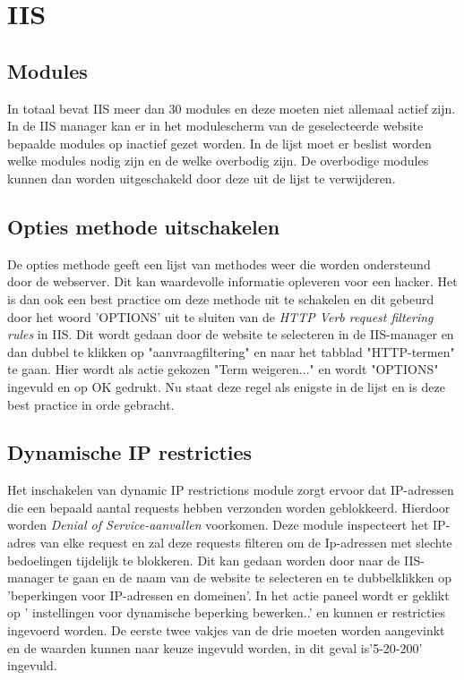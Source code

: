 \documentclass[pdftex,a4paper,12pt]{report}
\begin{document}
\section{IIS}
\subsection{Modules}
In totaal bevat IIS meer dan 30 modules en deze moeten niet allemaal actief zijn. In de IIS manager kan er in het modulescherm van de geselecteerde website bepaalde modules op inactief gezet worden. In de lijst moet er beslist worden welke modules nodig zijn en de welke overbodig zijn. De overbodige modules kunnen dan worden uitgeschakeld door deze uit de lijst te verwijderen. 

\subsection{Opties methode uitschakelen}
De opties methode geeft een lijst van methodes weer die worden ondersteund door de webserver. Dit kan waardevolle informatie opleveren voor een hacker. Het is dan ook een best practice om deze methode uit te schakelen en dit gebeurd door het woord 'OPTIONS' uit te sluiten van de \textit{HTTP Verb request filtering rules} in IIS. Dit wordt gedaan door de website te selecteren in de IIS-manager en dan dubbel te klikken op "aanvraagfiltering" en naar het tabblad "HTTP-termen" te gaan. Hier wordt als actie gekozen "Term weigeren..." en wordt "OPTIONS" ingevuld en op OK gedrukt. Nu staat deze regel als enigste in de lijst en is deze best practice in orde gebracht.

\subsection{Dynamische IP restricties}
Het inschakelen van dynamic IP restrictions module zorgt ervoor dat IP-adressen die een bepaald aantal requests hebben verzonden worden geblokkeerd. Hierdoor worden \textit{Denial of Service-aanvallen} voorkomen. Deze module inspecteert het IP-adres van elke request en zal deze requests filteren om de Ip-adressen met slechte bedoelingen tijdelijk te blokkeren. Dit kan gedaan worden door naar de IIS-manager te gaan en de naam van de website te selecteren en te dubbelklikken op 'beperkingen voor IP-adressen en domeinen'. In het actie paneel wordt er geklikt op '
instellingen voor dynamische beperking bewerken..' en kunnen er restricties ingevoerd worden. De eerste twee vakjes van de drie moeten worden aangevinkt en de waarden kunnen naar keuze ingevuld worden, in dit geval is'5-20-200' ingevuld. 
\end{document}
